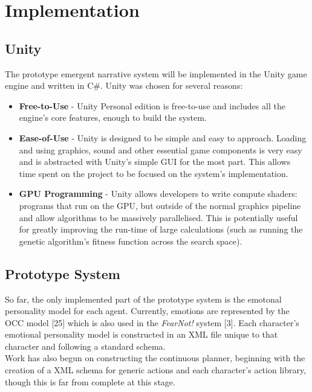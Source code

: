 \documentclass{sig-alternate-05-2015}
\begin{document}
\section{Implementation}
\subsection{Unity}

\noindent The prototype emergent narrative system will be implemented in the Unity game engine and written in C#. Unity was chosen for several reasons:
\begin{itemize}
	\item \textbf{Free-to-Use} - Unity Personal edition is free-to-use and includes all the engine’s core features, enough to build the system.
	\item \textbf{Ease-of-Use} - Unity is designed to be simple and easy to approach. Loading and using graphics, sound and other essential game components is very easy and is abstracted with Unity's simple GUI for the most part. This allows time spent on the project to be focused on the system's implementation.
	\item \textbf{GPU Programming} - Unity allows developers to write compute shaders: programs that run on the GPU, but outside of the normal graphics pipeline and allow algorithms to be massively parallelised. This is potentially useful for greatly improving the run-time of large calculations (such as running the genetic algorithm's fitness function across the search space).
\end{itemize}

\subsection{Prototype System}

\noindent So far, the only implemented part of the prototype system is the emotonal personality model for each agent. Currently, emotions are represented by the OCC model [25] which is also used in the \textit{FearNot!} system [3]. Each character's emotional personality model is constructed in an XML file unique to that character and following a standard schema.\\

\newline Work has also begun on constructing the continuous planner, beginning with the creation of a XML schema for generic actions and each character's action library, though this is far from complete at this stage.
\end{document}
